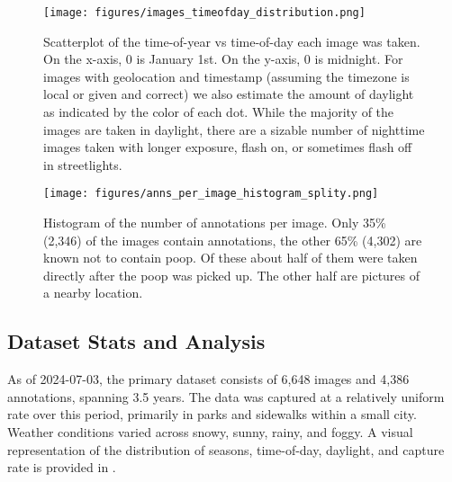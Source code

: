 \documentclass[10pt,twocolumn,letterpaper]{article}
\begin{document}

\begin{figure}[t]
\centering
\texttt{[image: figures/images\_timeofday\_distribution.png]}
\caption[]{
    Scatterplot of the time-of-year vs time-of-day each image was taken.
    On the x-axis, 0 is January 1st.
    On the y-axis, 0 is midnight.
    For images with geolocation and timestamp (assuming the timezone is local or given and correct) we also
      estimate the amount of daylight as indicated by the color of each dot.
    While the majority of the images are taken in daylight, there are a sizable number of nighttime images taken with longer exposure, flash on, or sometimes flash off in streetlights.
}
\label{fig:TimeOfDayDistribution}
\end{figure}


\begin{figure}[t]
\centering
\texttt{[image: figures/anns\_per\_image\_histogram\_splity.png]}
\caption[]{
    Histogram of the number of annotations per image. 
    Only 35\% (2,346) of the images contain annotations, the other 65\% (4,302)
    are known not to contain poop. Of these about half of them were taken
    directly after the poop was picked up. The other half are pictures of a
    nearby location.
}
\label{fig:AnnotsPerImage}
\end{figure}


\subsection{Dataset Stats and Analysis}

As of 2024-07-03, the primary dataset consists of 6,648 images and 4,386 annotations, spanning 3.5 years.
The data was captured at a relatively uniform rate over this period, primarily in parks and sidewalks within
  a small city.
Weather conditions varied across snowy, sunny, rainy, and foggy.
A visual representation of the distribution of seasons, time-of-day, daylight, and capture rate is provided
  in .
\end{document}
